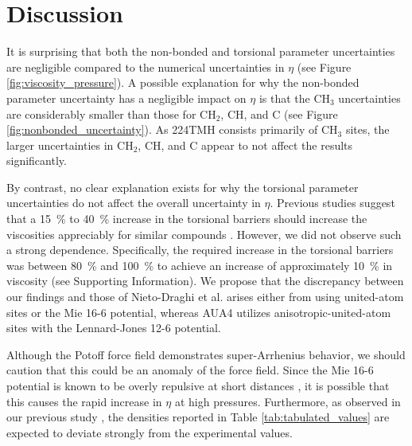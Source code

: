 \documentclass[preprint,review,12pt]{elsarticle}
\begin{document}
    \section{Discussion} \label{Discussion/Limitations}   
    
    It is surprising that both the non-bonded and torsional parameter uncertainties are negligible compared to the numerical uncertainties in $\eta$ (see Figure \ref{fig:viscosity_pressure}). A possible explanation for why the non-bonded parameter uncertainty has a negligible impact on $\eta$ is that the CH$_3$ uncertainties are considerably smaller than those for CH$_2$, CH, and C (see Figure \ref{fig:nonbonded_uncertainty}). As 224TMH consists primarily of CH$_3$ sites, the larger uncertainties in CH$_2$, CH, and C appear to not affect the results significantly. 
    
    
    By contrast, no clear explanation exists for why the torsional parameter uncertainties do not affect the overall uncertainty in $\eta$. Previous studies suggest that a 15~\% to 40~\% increase in the torsional barriers should increase the viscosities appreciably for similar compounds \cite{Nieto2006,Nieto2008}. However, we did not observe such a strong dependence. Specifically, the required increase in the torsional barriers was between 80~\% and 100~\% to achieve an increase of approximately 10~\% in viscosity (see Supporting Information). We propose that the discrepancy between our findings and those of Nieto-Draghi et al. arises either from using united-atom sites or the Mie 16-6 potential, whereas AUA4 utilizes anisotropic-united-atom sites with the Lennard-Jones 12-6 potential.
    
        
    Although the Potoff force field demonstrates super-Arrhenius behavior, we should caution that this could be an anomaly of the force field. Since the Mie 16-6 potential is known to be overly repulsive at short distances \cite{Postdoc_2,Postdoc_3}, it is possible that this causes the rapid increase in $\eta$ at high pressures. Furthermore, as observed in our previous study \cite{Postdoc_2}, the densities reported in Table \ref{tab:tabulated_values} are expected to deviate strongly from the experimental values.
    
\end{document}
